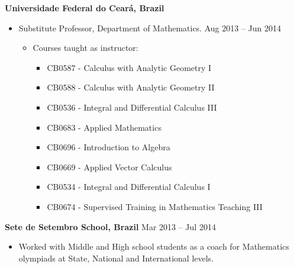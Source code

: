 \documentclass[10pt]{article}
\newenvironment{outerlist}[1][\enskip\textbullet]%
        {\begin{itemize}[#1,leftmargin=*]}{\end{itemize}%
         \vspace{-.6\baselineskip}}
\newenvironment{innerlist}[1][\enskip\textbullet]%
        {\begin{itemize}[#1,leftmargin=*,parsep=0pt,itemsep=0pt,topsep=0pt,partopsep=0pt]}
        {\end{itemize}}
\begin{document}
\vspace{1cm}
                                   
\textbf{Universidade Federal do Cear\'a, Brazil} 

\begin{outerlist}
\item[] Substitute Professor, Department of Mathematics. \hfill {Aug 2013 -- Jun 2014} 
\begin{innerlist}
                 \item[]Courses taught as instructor:
                                       \begin{innerlist}
                                                        \item[]CB0587 - Calculus with Analytic Geometry I
                                                        \item[]CB0588 - Calculus with Analytic Geometry II
                                                        \item[]CB0536 - Integral and Differential Calculus III
                                                        \item[]CB0683 - Applied Mathematics
                                                        \item[]CB0696 - Introduction to Algebra
                                                        \item[]CB0669 - Applied Vector Calculus
                                                        \item[]CB0534 - Integral and Differential Calculus I
                                                        \item[]CB0674 - Supervised Training in Mathematics Teaching III
                                        \end{innerlist}
\end{innerlist}
\end{outerlist}

\vspace{1cm}
\textbf{Sete de Setembro School, Brazil} \hfill {Mar 2013 -- Jul 2014}
\begin{innerlist}
\item[] Worked with Middle and High school students as a coach for Mathematics olympiads at State, National and International levels. 
\end{innerlist}

\vspace{1cm}
\end{document}
